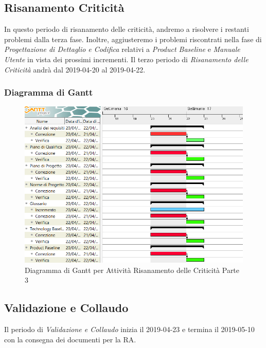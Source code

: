 \subsection{Risanamento Criticità}
In questo periodo di risanamento delle criticità, andremo a risolvere i restanti problemi dalla terza fase. Inoltre, aggiusteremo i problemi riscontrati nella fase di \textit{Progettazione di Dettaglio e Codifica} relativi a \textit{Product Baseline} e \textit{Manuale Utente} in vista dei prossimi incrementi.
Il terzo periodo di \textit{Risanamento delle Criticità} andrà dal 2019-04-20 al 2019-04-22.

\subsubsection{Diagramma di Gantt}
\begin{figure}[h]
	\centering
  		\includegraphics[width=1.0\linewidth]{./images/RisanamentoCriticita3.png}
  		\caption{Diagramma di Gantt per Attività Risanamento delle Criticità Parte 3}
  		\label{fig:Gantt Risananmento Criticità 3}
\end{figure}

\newpage
\subsection{Validazione e Collaudo}
Il periodo di \textit{Validazione e Collaudo} inizia il 2019-04-23 e termina il 2019-05-10 con la consegna dei documenti per la RA. 

